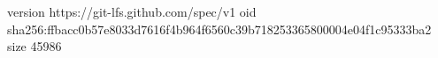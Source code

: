 version https://git-lfs.github.com/spec/v1
oid sha256:ffbacc0b57e8033d7616f4b964f6560c39b718253365800004e04f1c95333ba2
size 45986
